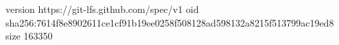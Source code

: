 version https://git-lfs.github.com/spec/v1
oid sha256:7614f8e8902611ce1cf91b19ee0258f508128ad598132a8215f513799ac19ed8
size 163350
